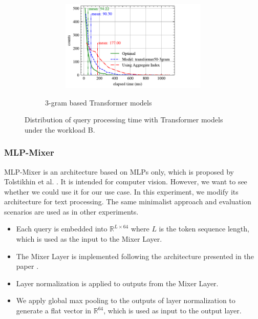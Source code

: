 \documentclass[conference]{IEEEtran}
\begin{document}
\begin{figure}[p]
\begin{subfigure}{0.45\textwidth}
\begin{subfigure}{\textwidth}
		\end{subfigure}
		\vfill
		\begin{subfigure}{\textwidth}
			\centering
			\includegraphics[]{graphics/perf_dist_transformer50_3gram_B.pdf}
		\end{subfigure}
		\caption{3-gram based Transformer models}
	\end{subfigure}
	\caption{Distribution of query processing time with Transformer models under the workload B.}
	\label{fig:transformer_perf_all_B}
\end{figure}

\subsubsection{MLP-Mixer}
\label{subsection:expt_mlpmixer}


MLP-Mixer is an architecture based on MLPs only, which is proposed by Tolstikhin et al. \cite{DBLP:journals/corr/abs-2105-01601}. It is intended for computer vision. However, we want to see whether we could use it for our use case. In this experiment, we modify its architecture for text processing. The same minimalist approach and evaluation scenarios are used as in other experiments.


\begin{itemize}
	\item Each query is embedded into $\mathbb{R}^{L\times 64}$ where $L$ is the token sequence length, which is used as the input to the Mixer Layer.
	\item The Mixer Layer is implemented following the architecture presented in the paper \cite{DBLP:journals/corr/abs-2105-01601}.
	\item Layer normalization is applied to outputs from the Mixer Layer.
	\item We apply global max pooling to the outputs of layer normalization to generate a flat vector in $\mathbb{R}^{64}$, which is used as input to the output layer.
\end{itemize}
\end{document}
